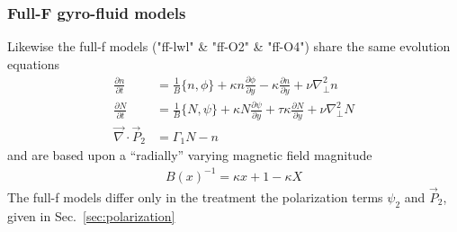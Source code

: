 \subsubsection{Full-F gyro-fluid models}
Likewise the full-f models ("ff-lwl" \& "ff-O2" \& "ff-O4") share the same evolution equations
\begin{subequations}
\begin{align}
 \frac{\partial n}{\partial t}     &= 
    \frac{1}{B}\{ n, \phi\} 
  + \kappa n\frac{\partial \phi}{\partial y} 
  -\kappa \frac{\partial n}{\partial y}
  + \nu \nabla_\perp^2 n  \\
  \frac{\partial N}{\partial t} &=
  \frac{1}{B}\{ N, \psi\} 
  + \kappa N\frac{\partial \psi}{\partial y} 
  + \tau \kappa\frac{\partial N}{\partial y} +\nu\nabla_\perp^2N \\
   \vec{\nabla}\cdot \vec{P}_2 &= \Gamma_1 N-n
\end{align}
\end{subequations}
and are based upon a ``radially'' varying magnetic field magnitude
\begin{align}
 B(x)^{-1} = \kappa x +1-\kappa X 
\end{align}
The full-f models differ only in the treatment the  polarization terms \(\psi_2\) and \(\vec{P}_2\), given in Sec.~\ref{sec:polarization}
